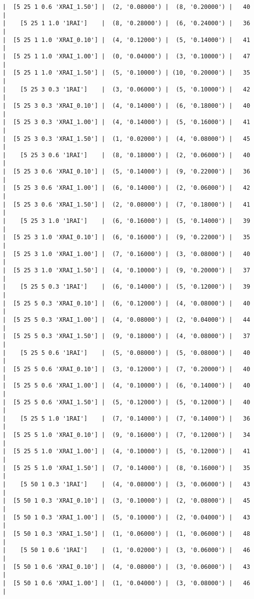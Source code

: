 \documentclass{article}
\begin{document}
\begin{verbatim}
|  [5 25 1 0.6 'XRAI_1.50'] |  (2, '0.08000') |  (8, '0.20000') |   40  |
|    [5 25 1 1.0 '1RAI']    |  (8, '0.28000') |  (6, '0.24000') |   36  |
|  [5 25 1 1.0 'XRAI_0.10'] |  (4, '0.12000') |  (5, '0.14000') |   41  |
|  [5 25 1 1.0 'XRAI_1.00'] |  (0, '0.04000') |  (3, '0.10000') |   47  |
|  [5 25 1 1.0 'XRAI_1.50'] |  (5, '0.10000') | (10, '0.20000') |   35  |
|    [5 25 3 0.3 '1RAI']    |  (3, '0.06000') |  (5, '0.10000') |   42  |
|  [5 25 3 0.3 'XRAI_0.10'] |  (4, '0.14000') |  (6, '0.18000') |   40  |
|  [5 25 3 0.3 'XRAI_1.00'] |  (4, '0.14000') |  (5, '0.16000') |   41  |
|  [5 25 3 0.3 'XRAI_1.50'] |  (1, '0.02000') |  (4, '0.08000') |   45  |
|    [5 25 3 0.6 '1RAI']    |  (8, '0.18000') |  (2, '0.06000') |   40  |
|  [5 25 3 0.6 'XRAI_0.10'] |  (5, '0.14000') |  (9, '0.22000') |   36  |
|  [5 25 3 0.6 'XRAI_1.00'] |  (6, '0.14000') |  (2, '0.06000') |   42  |
|  [5 25 3 0.6 'XRAI_1.50'] |  (2, '0.08000') |  (7, '0.18000') |   41  |
|    [5 25 3 1.0 '1RAI']    |  (6, '0.16000') |  (5, '0.14000') |   39  |
|  [5 25 3 1.0 'XRAI_0.10'] |  (6, '0.16000') |  (9, '0.22000') |   35  |
|  [5 25 3 1.0 'XRAI_1.00'] |  (7, '0.16000') |  (3, '0.08000') |   40  |
|  [5 25 3 1.0 'XRAI_1.50'] |  (4, '0.10000') |  (9, '0.20000') |   37  |
|    [5 25 5 0.3 '1RAI']    |  (6, '0.14000') |  (5, '0.12000') |   39  |
|  [5 25 5 0.3 'XRAI_0.10'] |  (6, '0.12000') |  (4, '0.08000') |   40  |
|  [5 25 5 0.3 'XRAI_1.00'] |  (4, '0.08000') |  (2, '0.04000') |   44  |
|  [5 25 5 0.3 'XRAI_1.50'] |  (9, '0.18000') |  (4, '0.08000') |   37  |
|    [5 25 5 0.6 '1RAI']    |  (5, '0.08000') |  (5, '0.08000') |   40  |
|  [5 25 5 0.6 'XRAI_0.10'] |  (3, '0.12000') |  (7, '0.20000') |   40  |
|  [5 25 5 0.6 'XRAI_1.00'] |  (4, '0.10000') |  (6, '0.14000') |   40  |
|  [5 25 5 0.6 'XRAI_1.50'] |  (5, '0.12000') |  (5, '0.12000') |   40  |
|    [5 25 5 1.0 '1RAI']    |  (7, '0.14000') |  (7, '0.14000') |   36  |
|  [5 25 5 1.0 'XRAI_0.10'] |  (9, '0.16000') |  (7, '0.12000') |   34  |
|  [5 25 5 1.0 'XRAI_1.00'] |  (4, '0.10000') |  (5, '0.12000') |   41  |
|  [5 25 5 1.0 'XRAI_1.50'] |  (7, '0.14000') |  (8, '0.16000') |   35  |
|    [5 50 1 0.3 '1RAI']    |  (4, '0.08000') |  (3, '0.06000') |   43  |
|  [5 50 1 0.3 'XRAI_0.10'] |  (3, '0.10000') |  (2, '0.08000') |   45  |
|  [5 50 1 0.3 'XRAI_1.00'] |  (5, '0.10000') |  (2, '0.04000') |   43  |
|  [5 50 1 0.3 'XRAI_1.50'] |  (1, '0.06000') |  (1, '0.06000') |   48  |
|    [5 50 1 0.6 '1RAI']    |  (1, '0.02000') |  (3, '0.06000') |   46  |
|  [5 50 1 0.6 'XRAI_0.10'] |  (4, '0.08000') |  (3, '0.06000') |   43  |
|  [5 50 1 0.6 'XRAI_1.00'] |  (1, '0.04000') |  (3, '0.08000') |   46  |

\end{verbatim}
\end{document}
